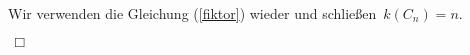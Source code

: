 Wir verwenden die Gleichung (\ref{fiktor}) wieder und schließen $\,\mathit{k}(C_n)=n$.\; 
\begin{flushright} $\,\Box\,$ \end{flushright} 
